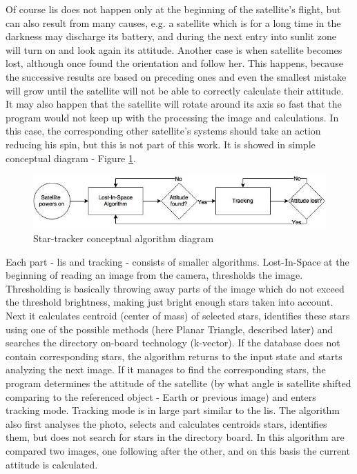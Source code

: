 \documentclass[12pt,a4paper,twoside]{article}
\begin{document}
Of course \gls{lis} does not happen only at the beginning of the satellite's flight, but can also result from many causes, e.g. a satellite which is for a long time in the darkness may discharge its battery, and during the next entry into sunlit zone will turn on and look again its attitude. Another case is when satellite becomes lost, although once found the orientation and follow her. This happens, because the successive results are based on preceding ones and even the smallest mistake will grow until the satellite will not be able to correctly calculate their attitude. It may also happen that the satellite will rotate around its axis so fast that the program would not keep up with the processing the image and calculations. In this case, the corresponding other satellite's systems should take an action reducing his spin, but this is not part of this work. It is showed in simple conceptual diagram - Figure \ref{fig:star-tracker_conceptual_alg}.

\begin{figure}[ht]
\includegraphics[scale=0.59]{startracker_eng.jpg}
\centering
\caption{Star-tracker conceptual algorithm diagram}
\label{fig:star-tracker_conceptual_alg}
\end{figure}

Each part - \gls{lis} and tracking - consists of smaller algorithms. Lost-In-Space at the beginning of reading an image from the camera, thresholds the image. Thresholding is basically throwing away parts of the image which do not exceed the threshold brightness, making just bright enough stars taken into account. Next it calculates centroid (center of mass) of selected stars, identifies these stars using one of the possible methods (here Planar Triangle, described later) and searches the directory on-board technology (k-vector).
If the database does not contain corresponding stars, the algorithm returns to the input state and starts analyzing the next image. If it manages to find the corresponding stars, the program determines the attitude of the satellite (by what angle is satellite shifted comparing to the referenced object - Earth or previous image) and enters tracking mode. Tracking mode is in large part similar to the \gls{lis}. The algorithm also first analyses the photo, selects and calculates centroids stars, identifies them, but does not search for stars in the directory board. In this algorithm are compared two images, one following after the other, and on this basis the current attitude is calculated.
\end{document}
